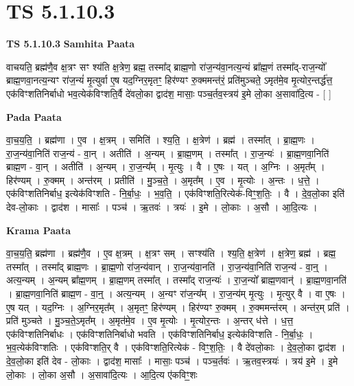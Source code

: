 \documentclass[17pt]{extarticle}
\begin{document}
\section{ TS 5.1.10.3 }

\textbf{TS 5.1.10.3 } \newline
\textbf{Samhita Paata} \newline

वाचयति॒ ब्रह्म॑णै॒व क्ष॒त्रꣳ सꣳ श्य॑ति क्ष॒त्रेण॒ ब्रह्म॒ तस्मा᳚द् ब्राह्म॒णो रा॑ज॒न्य॑वा॒नत्य॒न्यं ब्रा᳚ह्म॒णं तस्मा᳚द्-राज॒न्यो᳚ ब्राह्म॒णवा॒नत्य॒न्यꣳ रा॑ज॒न्यं॑ मृ॒त्युर्वा ए॒ष यद॒ग्निर॒मृतꣳ॒॒ हिर॑ण्यꣳ रु॒क्ममन्त॑रं॒ प्रति॑मुञ्चते॒ ऽमृत॑मे॒व मृ॒त्योर॒न्तर्द्ध॑त्त॒ एक॑विꣳशतिनिर्बाधो भव॒त्येक॑विꣳशति॒र्वै दे॑वलो॒का द्वाद॑श॒ मासाः॒ पञ्च॒र्तव॒स्त्रय॑ इ॒मे लो॒का अ॒सावा॑दि॒त्य - [  ] \newline

\textbf{Pada Paata} \newline

वा॒च॒य॒ति॒ । ब्रह्म॑णा । ए॒व । क्ष॒त्रम् । समिति॑ । श्य॒ति॒ । क्ष॒त्रेण॑ । ब्रह्म॑ । तस्मा᳚त् । ब्रा॒ह्म॒णः । रा॒ज॒न्य॑वा॒निति॑ राज॒न्य॑ - वा॒न् । अतीति॑ । अ॒न्यम् । ब्रा॒ह्म॒णम् । तस्मा᳚त् । रा॒ज॒न्यः॑ । ब्रा॒ह्म॒णवा॒निति॑ ब्राह्म॒ण - वा॒न् । अतीति॑ । अ॒न्यम् । रा॒ज॒न्य᳚म् । मृ॒त्युः । वै । ए॒षः । यत् । अ॒ग्निः । अ॒मृत᳚म् । हिर॑ण्यम् । रु॒क्मम् । अन्त॑रम् । प्रतीति॑ । मु॒ञ्च॒ते॒ । अ॒मृत᳚म् । ए॒व । मृ॒त्योः । अ॒न्तः । ध॒त्ते॒ । एक॑विꣳशतिनिर्बाध॒ इत्येक॑विꣳशति - नि॒र्बा॒धः॒ । भ॒व॒ति॒ । एक॑विꣳशति॒रित्येक॑-विꣳ॒॒श॒तिः॒ । वै । दे॒व॒लो॒का इति॑ देव-लो॒काः । द्वाद॑श । मासाः᳚ । पञ्च॑ । ऋ॒तवः॑ । त्रयः॑ । इ॒मे । लो॒काः । अ॒सौ । आ॒दि॒त्यः ।  \newline


\textbf{Krama Paata} \newline

वा॒च॒य॒ति॒ ब्रह्म॑णा । ब्रह्म॑णै॒व । ए॒व क्ष॒त्रम् । क्ष॒त्रꣳ सम् । सꣳश्य॑ति । श्य॒ति॒ क्ष॒त्रेण॑ । क्ष॒त्रेण॒ ब्रह्म॑ । ब्रह्म॒ तस्मा᳚त् । तस्मा᳚द् ब्राह्म॒णः । ब्रा॒ह्म॒णो रा॑ज॒न्य॑वान् । रा॒ज॒न्य॑वा॒नति॑ । रा॒ज॒न्य॑वा॒निति॑ राज॒न्य॑ - वा॒न्॒ । अत्य॒न्यम् । अ॒न्यम् ब्रा᳚ह्म॒णम् । ब्रा॒ह्म॒णम् तस्मा᳚त् । तस्मा᳚द् राज॒न्यः॑ । रा॒ज॒न्यो᳚ ब्राह्म॒णवान्॑ । ब्रा॒ह्म॒णवा॒नति॑ । ब्रा॒ह्म॒णवा॒निति॑ ब्राह्म॒ण - वा॒न्॒ । अत्य॒न्यम् । अ॒न्यꣳ रा॑ज॒न्य᳚म् । रा॒ज॒न्य॑म् मृ॒त्युः । मृ॒त्युर् वै । वा ए॒षः । ए॒ष यत् । यद॒ग्निः । अ॒ग्निर॒मृत᳚म् । अ॒मृतꣳ॒॒ हिर॑ण्यम् । हिर॑ण्यꣳ रु॒क्मम् । रु॒क्ममन्त॑रम् । अन्त॑र॒म् प्रति॑ । प्रति॑ मुञ्चते । मु॒ञ्च॒ते॒ऽमृत᳚म् । अ॒मृत॑मे॒व । ए॒व मृ॒त्योः । मृ॒त्योर॒न्तः । अ॒न्तर् ध॑त्ते । ध॒त्त॒ एक॑विꣳशतिनिर्बाधः । एक॑विꣳशतिनिर्बाधो भवति । एक॑विꣳशतिनिर्बाध॒ इत्येक॑विꣳशति - नि॒र्बा॒धः॒ । भ॒व॒त्येक॑विꣳशतिः । एक॑विꣳशति॒र् वै । एक॑विꣳशति॒रित्येक॑ - विꣳ॒॒श॒तिः॒ । वै दे॑वलो॒काः । दे॒व॒लो॒का द्वाद॑श । दे॒व॒लो॒का इति॑ देव - लो॒काः । द्वाद॑श॒ मासाः᳚ । मासाः॒ पञ्च॑ । पञ्च॒र्तवः॑ । ऋ॒तव॒स्त्रयः॑ । त्रय॑ इ॒मे । इ॒मे लो॒काः । लो॒का अ॒सौ । अ॒सावा॑दि॒त्यः । आ॒दि॒त्य ए॑कविꣳ॒॒शः \newline
\end{document}
